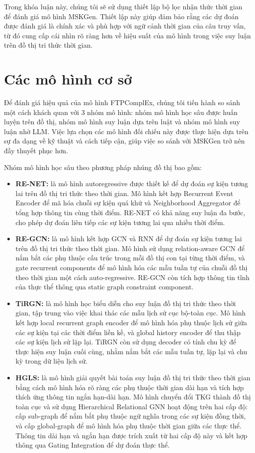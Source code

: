 Trong khóa luận này, chúng tôi sẽ sử dụng thiết lập bộ lọc nhận thức thời gian để đánh giá mô hình MSKGen. Thiết lập này giúp đảm bảo rằng các dự đoán được đánh giá là chính xác và phù hợp với ngữ cảnh thời gian của câu truy vấn, từ đó cung cấp cái nhìn rõ ràng hơn về hiệu suất của mô hình trong việc suy luận trên đồ thị tri thức thời gian.
\section{Các mô hình cơ sở}
Để đánh giá hiệu quả của mô hình FTPComplEx, chúng tôi tiến hành so sánh một cách khách quan với 3 nhóm mô hình: nhóm mô hình học sâu được huấn luyện trên đồ thị, nhóm mô hình suy luận dựa trên luật và nhóm mô hình suy luận nhờ LLM. Việc lựa chọn các mô hình đối chiếu này được thực hiện dựa trên sự đa dạng về kỹ thuật và cách tiếp cận, giúp việc so sánh với MSKGen trở nên đầy thuyết phục hơn. 

Nhóm mô hình học sâu theo phương pháp nhúng đồ thị bao gồm:
\begin{itemize}
    \item \textbf{RE-NET:} là mô hình autoregressive được thiết kế để dự đoán sự kiện tương lai trên đồ thị tri thức theo thời gian. Mô hình kết hợp Recurrent Event Encoder để mã hóa chuỗi sự kiện quá khứ và Neighborhood Aggregator để tổng hợp thông tin cùng thời điểm. RE-NET có khả năng suy luận đa bước, cho phép dự đoán liên tiếp các sự kiện tương lai qua nhiều thời điểm.
    \item \textbf{RE-GCN:} là mô hình kết hợp GCN và RNN để dự đoán sự kiện tương lai trên đồ thị tri thức theo thời gian. Mô hình sử dụng relation-aware GCN để nắm bắt các phụ thuộc cấu trúc trong mỗi đồ thị con tại từng thời điểm, và gate recurrent components để mô hình hóa các mẫu tuần tự của chuỗi đồ thị theo thời gian một cách auto-regressive. RE-GCN còn tích hợp thông tin tĩnh của thực thể thông qua static graph constraint component.
    \item \textbf{TiRGN:}  là mô hình học biểu diễn cho suy luận đồ thị tri thức theo thời gian, tập trung vào việc khai thác các mẫu lịch sử cục bộ-toàn cục. Mô hình kết hợp local recurrent graph encoder để mô hình hóa phụ thuộc lịch sử giữa các sự kiện tại các thời điểm liền kề, và global history encoder để thu thập các sự kiện lịch sử lặp lại. TiRGN còn sử dụng decoder có tính chu kỳ để thực hiện suy luận cuối cùng, nhằm nắm bắt các mẫu tuần tự, lặp lại và chu kỳ trong dữ liệu lịch sử.
    \item \textbf{HGLS:} là mô hình giải quyết bài toán suy luận đồ thị tri thức theo thời gian bằng cách mô hình hóa rõ ràng các phụ thuộc thời gian dài hạn và tích hợp thích ứng thông tin ngắn hạn-dài hạn. Mô hình chuyển đổi TKG thành đồ thị toàn cục và sử dụng Hierarchical Relational GNN hoạt động trên hai cấp độ: cấp sub-graph để nắm bắt phụ thuộc ngữ nghĩa trong các sự kiện đồng thời, và cấp global-graph để mô hình hóa phụ thuộc thời gian giữa các thực thể. Thông tin dài hạn và ngắn hạn được trích xuất từ hai cấp độ này và kết hợp thông qua Gating Integration để dự đoán thực thể.
\end{itemize}

